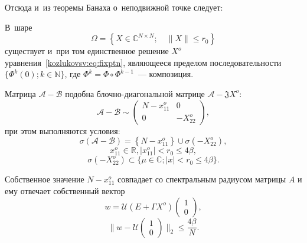 Отсюда и~из теоремы Банаха о~неподвижной точке следует:
\begin{ksvlem}
В~шаре \[ \Omega = \left\{ X\in\mathbb{C}^{N{\times}N}; \quad \|X\| \leq r_0 \right\} \]
    существует и~при том единственное решение \( X^o \) уравнения~\eqref{kozlukovsv:eq:fixptn},
    являющееся пределом последовательности \( \{ \Phi^k(0); k\in\mathbb{N} \} \),
    где \( \Phi^k = \Phi\circ\Phi^{k-1} \)~--- композиция.
\end{ksvlem}

\begin{ksvcrl}
    Матрица \( \mathcal{A} - \mathcal{B} \) подобна блочно-диагональной матрице \( \mathcal{A} - \mathfrak{J} X^o \):
    \[ \mathcal{A} - \mathcal{B} \sim
    \begin{pmatrix}
    N - x_{11}^o & 0 \\
    0 & -X_{22}^o
    \end{pmatrix}, \]
        при этом выполняются условия:
    \[ \sigma\left(\mathcal{A} - \mathcal{B}\right) = \left\{N-x_{11}^o\right\}\cup \sigma\left(-X_{22}^o\right), \]
        \[ x_{11}^o\in\mathbb{R}, \lvert x_{11}^o \rvert < r_0 \leq 4\beta, \]
    \[ \sigma\left(-X_{22}^o\right) \subset \{ \mu\in\mathbb{C}; \lvert x \rvert < r_0 \leq 4\beta \}. \]

    Собственное значение \( N - x_{11}^o \)
    совпадает со спектральным радиусом матрицы \( A \)
    и ему отвечает собственный вектор
    \[ 
        w = \mathcal{U}(E + \Gamma X^o)\begin{pmatrix}1\\0\end{pmatrix},
        \]
    \[
        \|w - \mathcal{U}\begin{pmatrix}1\\0\end{pmatrix}\|_2 \leq \frac{4\beta}{N}.
        \]
\end{ksvcrl}
